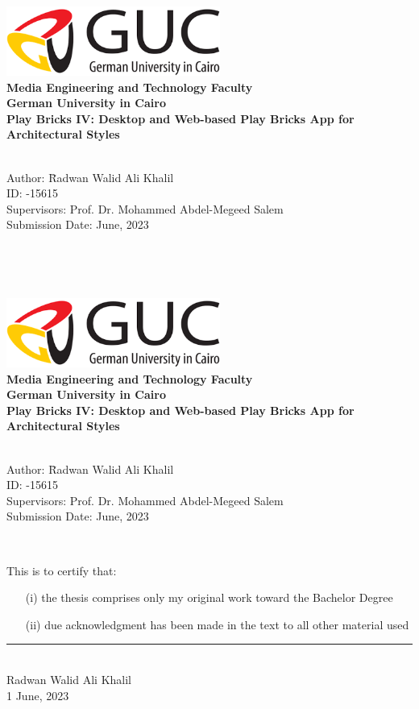 \newcommand{\titlePage}{

\thispagestyle{empty}
\begin{center}
	\includegraphics[width=7cm]{gucLogo.jpg}\\
	\textbf{Media Engineering and Technology Faculty}\\[1mm]
	\textbf{German University in Cairo}\\[1mm]
	
	\vspace{2cm}
	\doublespacing
	{\Huge \textbf{Play Bricks IV: Desktop and Web-based Play Bricks App for Architectural Styles}}\\
	\singlespacing
	\vspace{2cm}
	{\large \textbf{\typeOfThesis}}\\
	
	\vfill
	\parbox{1cm}{
  		\begin{large}
    			\begin{tabbing}
       			Author: \hspace{2cm}  
        			\=Radwan Walid Ali Khalil \\[2mm]
                    
                    ID:
                    \>49-15615\\[2mm]
                    
      			Supervisors: 
        			\>Prof. Dr. Mohammed Abdel-Megeed Salem\\[2mm]
				    
      			Submission Date: 
        			\>1 June, 2023\\
    			\end{tabbing}
  		\end{large}
	}\\
\end{center}
}
\titlePage
\thispagestyle{empty}\
\titlePage
\thispagestyle{empty}
This is to certify that:
\begin{itemize}
\item[(i)] the thesis comprises only my original work toward the Bachelor Degree
\item[(ii)] due acknowledgment has been made in the text to all other material used
\end{itemize}

\vspace{2cm}
\begin{flushright}
\rule[0mm]{6cm}{0.2mm}\\
Radwan Walid Ali Khalil \\
1 June, 2023\\
\end{flushright}

